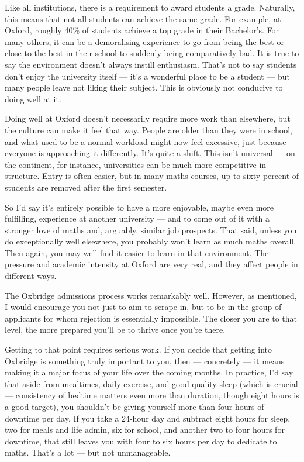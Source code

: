 \documentclass[11pt]{article}
\newif\ifshowcomments
\newcommand{\comment}[1]{\ifshowcomments\textcolor{myblue}{\textbf{#1}}\fi}
\begin{document}
Like all institutions, there is a requirement to award students a grade. Naturally, this means that not all students can achieve the same grade. For example, at Oxford, roughly 40\% of students achieve a top grade in their Bachelor's. For many others, it can be a demoralising experience to go from being the best or close to the best in their school to suddenly being comparatively bad. It is true to say the environment doesn’t always instill enthusiasm. That’s not to say students don’t enjoy the university itself — it’s a wonderful place to be a student — but many people leave not liking their subject. This is obviously not conducive to doing well at it.

Doing well at Oxford doesn’t necessarily require more work than elsewhere, but the culture can make it feel that way. People are older than they were in school, and what used to be a normal workload might now feel excessive, just because everyone is approaching it differently. It’s quite a shift. This isn’t universal --- on the continent, for instance, universities can be much more competitive in structure. Entry is often easier, but in many maths courses, up to sixty percent of students are removed after the first semester.

So I’d say it’s entirely possible to have a more enjoyable, maybe even more fulfilling, experience at another university --- and to come out of it with a stronger love of maths and, arguably, similar job prospects. That said, unless you do exceptionally well elsewhere, you probably won’t learn as much maths overall. Then again, you may well find it easier to learn in that environment. The pressure and academic intensity at Oxford are very real, and they affect people in different ways.

\comment{From what I've seen of you, Qasim, you have the curiosity and ability that Oxbridge looks for! So don't worry about being good enough!}

The Oxbridge admissions process works remarkably well. However, as mentioned, I would encourage you not just to aim to scrape in, but to be in the group of applicants for whom rejection is essentially impossible. The closer you are to that level, the more prepared you’ll be to thrive once you’re there.

Getting to that point requires serious work. If you decide that getting into Oxbridge is something truly important to you, then --- concretely --- it means making it a major focus of your life over the coming months. In practice, I’d say that aside from mealtimes, daily exercise, and good-quality sleep (which is crucial --- consistency of bedtime matters even more than duration, though eight hours is a good target), you shouldn’t be giving yourself more than four hours of downtime per day. If you take a 24-hour day and subtract eight hours for sleep, two for meals and life admin, six for school, and another two to four hours for downtime, that still leaves you with four to six hours per day to dedicate to maths. That’s a lot --- but not unmanageable.
\end{document}
